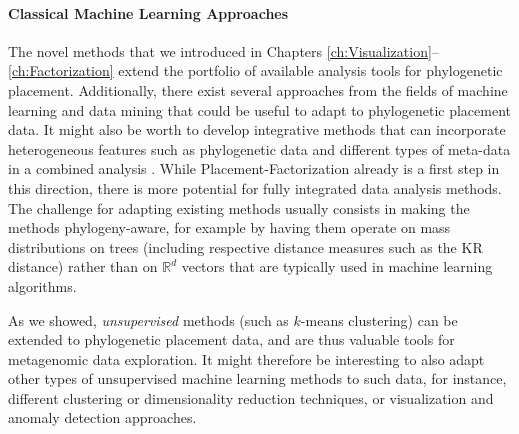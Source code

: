 
\paragraph{Classical Machine Learning Approaches}
\label{ch:ConclusionOutlook:sec:AnalysisMethods:par:MachineLearningApproaches}

The novel methods that we introduced in Chapters \ref{ch:Visualization}--\ref{ch:Factorization}
extend the portfolio of available analysis tools for phylogenetic placement.
Additionally, there exist several approaches from the fields of machine learning and data mining
that could be useful to adapt to phylogenetic placement data.
It might also be worth to develop integrative methods that can incorporate heterogeneous features
such as phylogenetic data and different types of meta-data in a combined analysis \cite{Mariette2018}.
While Placement-Factorization already is a first step in this direction,
there is more potential for fully integrated data analysis methods.
The challenge for adapting existing methods usually consists in making the methods phylogeny-aware,
for example by having them operate on mass distributions on trees
(including respective distance measures such as the KR distance) rather than on $\mathbb{R}^d$ vectors
that are typically used in machine learning algorithms.

As we showed, %
\emph{unsupervised} methods (such as $k$-means clustering) can be extended to phylogenetic placement data,
and are thus valuable tools for metagenomic data exploration.
It might therefore be interesting to also adapt other types of unsupervised machine learning methods to such data,
for instance, different clustering \cite{Kriegel2011} or dimensionality reduction \cite{VanDerMaaten2008} techniques,
or visualization \cite{Laczny2014} and anomaly detection approaches.


